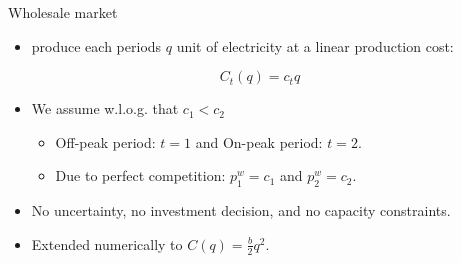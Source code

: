 \documentclass{class}
\begin{document}
\begin{frame}{Wholesale market}


\begin{itemize}
    \item {} produce each periods $q$ unit of electricity at a linear production cost: 
\end{itemize}

\begin{equation*}
    C_t(q) = c_t q
\end{equation*}

\vfill

\begin{itemize}
    \item We assume w.l.o.g. that $c_1 < c_2$

\vfill

\begin{itemize}
    \item Off-peak period: $t = 1$ and On-peak period: $t = 2$. \vfill
    \item Due to perfect competition: $p_1^w = c_1$ and $p_2^w = c_2$.
\end{itemize}


\vfill

\item  No uncertainty, no investment decision, and no capacity constraints.

\vfill

\item Extended numerically to $\displaystyle C(q) = \frac{b}{2} q^2$.


\end{itemize}
    
\end{frame}

% 

    
\end{document}
